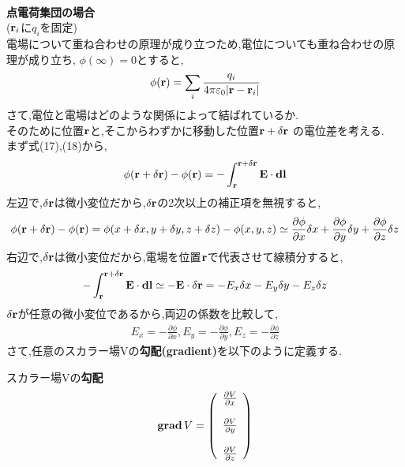\documentclass[../main]{subfiles}
\begin{document}
\\
{\bf 点電荷集団の場合} \\
(${\bf r}_i$に$q_i$を固定) \\
電場について重ね合わせの原理が成り立つため,電位についても重ね合わせの原理が成り立ち, $\phi(\infty) = 0$とすると,
\begin{eqnarray}
\phi ({\bf r}) = \sum_i \frac{q_i}{4 \pi \varepsilon_0 |{\bf r}-{\bf r}_i|}
\end{eqnarray}
さて,電位と電場はどのような関係によって結ばれているか. \\
そのために位置${\bf r}$と,そこからわずかに移動した位置${\bf r}+{\bf \delta {\bf r}}$ の電位差を考える. \\
まず式(17),(18)から,
\begin{eqnarray}
\phi ({\bf r}+{\bf \delta {\bf r}}) - \phi({\bf r}) = - \int_{{\bf r}}^{{\bf r}+{\bf \delta {\bf r}}} {\bf E} \cdot {\bf dl}
\end{eqnarray}
左辺で,$\delta {\bf r}$は微小変位だから,${\bf \delta {\bf r}}$の2次以上の補正項を無視すると,
\begin{eqnarray}
\phi ({\bf r}+{\bf \delta {\bf r}}) - \phi({\bf r}) = \phi (x+ \delta x, y + \delta y, z + \delta z) - \phi(x,y,z) \simeq \frac{\partial \phi}{\partial x} \delta x + \frac{\partial \phi}{\partial y} \delta y + \frac{\partial \phi}{\partial z} \delta z
\end{eqnarray}
右辺で,$\delta {\bf r}$は微小変位だから,電場を位置${\bf r}$で代表させて線積分すると,
\begin{eqnarray}
- \int_{{\bf r}}^{{\bf r}+{\bf \delta {\bf r}}} {\bf E} \cdot {\bf dl} \simeq - {\bf E} \cdot {\bf \delta r} = - E_x \delta x - E_y \delta y - E_z \delta z
\end{eqnarray}
${\bf \delta r}$が任意の微小変位であるから,両辺の係数を比較して,
\begin{eqnarray}
E_x = - \frac{\partial \phi}{\partial x}, E_y = - \frac{\partial \phi}{\partial y}, E_z = - \frac{\partial \phi}{\partial z}
\end{eqnarray}
さて,任意のスカラー場Vの{\bf 勾配(gradient)}を以下のように定義する. \\
\begin{itembox}[c]{スカラー場Vの{\bf 勾配}}
\begin{eqnarray}
{\rm {\bf grad}}\,V =
\left(
\begin{array}{l}
\frac{\partial V}{\partial x} \\
\\
\frac{\partial V}{\partial y} \\
\\
\frac{\partial V}{\partial z}
\end{array}
\right)
\end{eqnarray}
\end{itembox}
\end{document}
